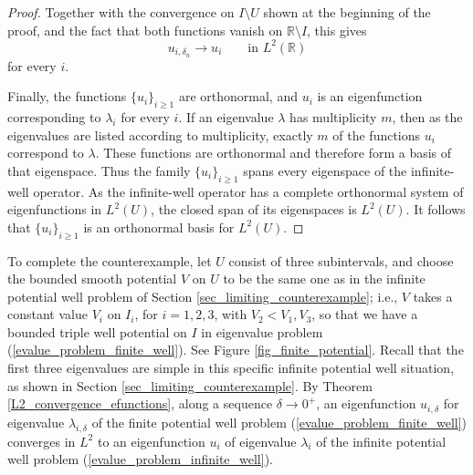 \documentclass[preprint,12pt]{elsarticle}
\newcommand{\R}{\mathbb R}
\begin{document}
{\begin{proof}
Together with the convergence on $I\setminus U$ shown at the beginning of the proof, and the fact that both functions vanish on $\R\setminus I$, this gives
\[
    u_{i,\delta_n}
    \longrightarrow u_i
    \qquad\text{in }L^2(\R)
\]
for every $i$.

Finally, the functions $\{u_i\}_{i\geq1}$ are orthonormal, and
$u_i$ is an eigenfunction corresponding to $\lambda_i$ for every $i$. If an eigenvalue $\lambda$ has multiplicity $m$, then as the eigenvalues are listed according to multiplicity, exactly $m$ of the functions $u_i$ correspond to $\lambda$. These functions are orthonormal and therefore
form a basis of that eigenspace. Thus the family $\{u_i\}_{i\geq1}$ spans every eigenspace of the infinite-well operator. As the infinite-well operator has a complete orthonormal system of eigenfunctions in $L^2(U)$, the closed span of its eigenspaces is $L^2(U)$. It follows that $\{u_i\}_{i\geq1}$ is 
an orthonormal basis for $L^2(U)$.
\end{proof}



To complete the counterexample, let $U$ consist of three subintervals, and choose the bounded smooth potential $V$ on $U$ to be the same one as in the infinite potential well problem of Section \ref{sec_limiting_counterexample};  i.e., $V$ takes a constant value $V_i$ on $I_i$, for $i=1,2,3$, with $V_2<V_1,V_3$, so that we have a bounded triple well potential on $I$ in eigenvalue problem (\ref{evalue_problem_finite_well}). See Figure \ref{fig_finite_potential}. Recall that the first three eigenvalues are simple in this specific infinite potential well situation, as shown in Section \ref{sec_limiting_counterexample}. 
By Theorem \ref{L2_convergence_efunctions}, along a sequence
$\delta\to0^+$, an eigenfunction $u_{i,\delta}$ for eigenvalue
$\lambda_{i,\delta}$ of the finite potential well problem
(\ref{evalue_problem_finite_well}) converges in $L^2$ to an
eigenfunction $u_i$ of eigenvalue $\lambda_i$ of the infinite
potential well problem (\ref{evalue_problem_infinite_well}).

}
\end{document}
